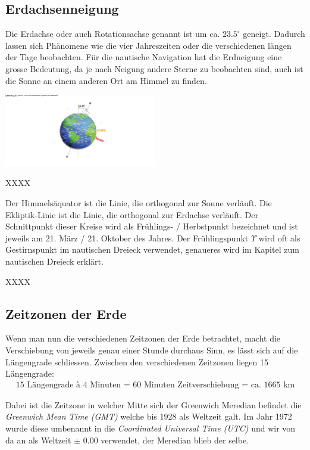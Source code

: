 \begin{refsection}
\subsection{Erdachsenneigung}
Die Erdachse oder auch Rotationsachse genannt ist um ca. $23.5^{\circ}$ geneigt.
Dadurch lassen sich Phänomene wie die vier Jahreszeiten oder die verschiedenen längen der Tage beobachten.
Für die nautische Navigation hat die Erdneigung eine grosse Bedeutung, da je nach Neigung andere Sterne zu beobachten sind, auch ist die Sonne an einem anderen Ort am Himmel zu finden.

\begin{center}
        \includegraphics[width=0.5\textwidth]{kugel/1Ekliptik.jpg}
\end{center}


XXXX

Der Himmelsäquator ist die Linie, die orthogonal zur Sonne verläuft.
Die Ekliptik-Linie ist die Linie, die orthogonal zur Erdachse verläuft.
Der Schnittpunkt dieser Kreise wird als Frühlings- / Herbstpunkt bezeichnet und ist jeweils am 21. März / 21. Oktober des Jahres.
Der Frühlingspunkt $\Upsilon$ wird oft als Gestirnspunkt im nautischen Dreieck verwendet, genaueres wird im Kapitel zum nautischen Dreieck erklärt.


XXXX

\subsection{Zeitzonen der Erde} \label{Zeitzonen} 
Wenn man nun die verschiedenen Zeitzonen der Erde betrachtet, macht die Verschiebung von jeweils genau einer Stunde durchaus Sinn, es lässt sich auf die Längengrade schliessen.
Zwischen den verschiedenen Zeitzonen liegen 15 Längengrade:
\begin{align*}
\text{15 Längengrade à 4 Minuten = 60 Minuten Zeitverschiebung = ca. 1665 km}
\end{align*}

Dabei ist die Zeitzone in welcher Mitte sich der Greenwich Meredian befindet die \textit{Greenwich Mean Time (GMT)} welche bis 1928 als Weltzeit galt. Im Jahr 1972 wurde diese umbenannt in die \textit{Coordinated Universal Time (UTC)} und wir von da an als Weltzeit $\pm$ 0.00 verwendet, der Meredian blieb der selbe.



\end{refsection}
